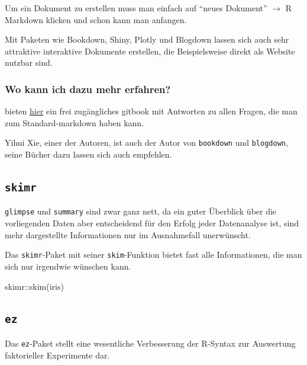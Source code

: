 \documentclass[
]{book}
\newenvironment{Shaded}{\begin{snugshade}}{\end{snugshade}}
\newcommand{\FunctionTok}[1]{\textcolor[rgb]{0.00,0.00,0.00}{#1}}
\newcommand{\NormalTok}[1]{#1}
\newcommand{\SpecialCharTok}[1]{\textcolor[rgb]{0.00,0.00,0.00}{#1}}
\begin{document}
Um ein Dokument zu erstellen muss man einfach auf ``neues Dokument'' \(\rightarrow\) R Markdown klicken und schon kann man anfangen.

Mit Paketen wie Bookdown, Shiny, Plotly und Blogdown lassen sich auch sehr attraktive interaktive Dokumente erstellen, die Beispielsweise direkt als Website nutzbar sind.

\hypertarget{wo-kann-ich-dazu-mehr-erfahren}{%
\subsubsection{Wo kann ich dazu mehr erfahren?}\label{wo-kann-ich-dazu-mehr-erfahren}}

\citet{grolemundMarkdownDefinitiveGuide} bieten \href{https://bookdown.org/yihui/rmarkdown/}{hier} ein frei zugängliches gitbook mit Antworten zu allen Fragen, die man zum Standard-markdown haben kann.

Yihui Xie, einer der Autoren, ist auch der Autor von \texttt{bookdown} und \texttt{blogdown}, seine Bücher dazu lassen sich auch empfehlen.

\hypertarget{skimr}{%
\subsection{\texorpdfstring{\texttt{skimr}}{skimr}}\label{skimr}}

\texttt{glimpse} und \texttt{summary} sind zwar ganz nett, da ein guter Überblick über die vorliegenden Daten aber entscheidend für den Erfolg jeder Datenanalyse ist, sind mehr dargestellte Informationen nur im Ausnahmefall unerwünscht.

Das \texttt{skimr}-Paket mit seiner \texttt{skim}-Funktion bietet fast alle Informationen, die man sich nur irgendwie wünschen kann.

\begin{Shaded}
\begin{Highlighting}[]
\NormalTok{skimr}\SpecialCharTok{::}\FunctionTok{skim}\NormalTok{(iris)}
\end{Highlighting}
\end{Shaded}

\hypertarget{ez}{%
\subsection{\texorpdfstring{\texttt{ez}}{ez}}\label{ez}}

Das \texttt{ez}-Paket stellt eine wesentliche Verbesserung der R-Syntax zur Auswertung faktorieller Experimente dar.
\end{document}

